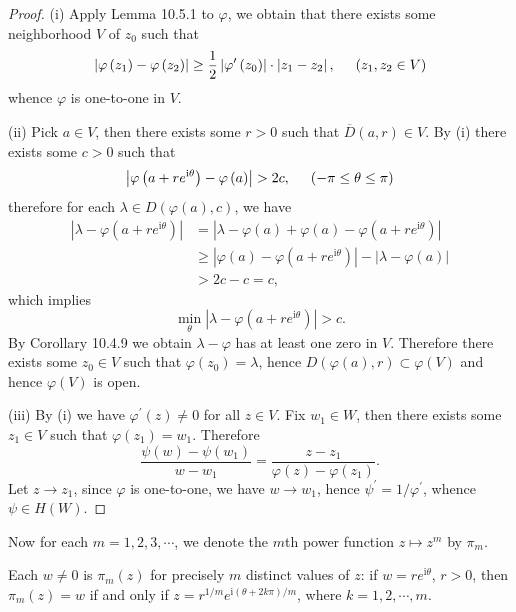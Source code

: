 \begin{proof}
(i) Apply Lemma 10.5.1 to $\varphi$, we obtain that there exists some neighborhood $V$ of $z_0$ such that 
$$
\left| \varphi \left( z_1 \right) -\varphi \left( z_2 \right) \right|\ge \frac{1}{2}\left| \varphi ^{\prime}\left( z_0 \right) \right|\cdot \left| z_1-z_2 \right|,\hspace{0.5cm}\left( z_1,z_2\in V \right) 
$$
whence $\varphi$ is one-to-one in $V$.\par
(ii) Pick $a\in V$, then there exists some $r>0$ such that $\overline{D}(a,r)\in V$. By (i) there exists some $c>0$ such that 
$$
\left| \varphi \left( a+re^{\mathrm{i}\theta} \right) -\varphi \left( a \right) \right|>2c,\hspace{0.5cm}\left( -\pi \le \theta \le \pi \right) 
$$
therefore for each $\lambda\in D(\varphi(a),c)$, we have 
$$
\begin{aligned}
\left| \lambda -\varphi \left( a+re^{\mathrm{i}\theta} \right) \right|&=\left| \lambda -\varphi \left( a \right) +\varphi \left( a \right) -\varphi \left( a+re^{\mathrm{i}\theta} \right) \right|
\\
&\ge \left| \varphi \left( a \right) -\varphi \left( a+re^{\mathrm{i}\theta} \right) \right|-\left| \lambda -\varphi \left( a \right) \right|
\\
&>2c-c=c,
\end{aligned}
$$
which implies 
$$
\min_{\theta} \left| \lambda -\varphi \left( a+re^{\mathrm{i}\theta} \right) \right|>c.
$$
By Corollary 10.4.9 we obtain $\lambda-\varphi$ has at least one zero in $V$. Therefore there exists some $z_0\in V$ such that $\varphi(z_0)=\lambda$, hence $D(\varphi(a),r)\subset\varphi(V)$ and hence $\varphi(V)$ is open.\par
(iii) By (i) we have $\varphi^\prime(z)\ne 0$ for all $z\in V$. Fix $w_1\in W$, then there exists some $z_1\in V$ such that $\varphi(z_1)=w_1$. Therefore 
$$
\frac{\psi \left( w \right) -\psi \left( w_1 \right)}{w-w_1}=\frac{z-z_1}{\varphi \left( z \right) -\varphi \left( z_1 \right)}.
$$
Let $z\to z_1$, since $\varphi$ is one-to-one, we have $w\to w_1$, hence $\psi^\prime=1/\varphi^\prime$, whence $\psi\in H(W)$.
\end{proof}
Now for each $m=1,2,3,\cdots$, we denote the $m$th power function $z\mapsto z^m$ by $\pi_m$.\par
Each $w\ne 0$ is $\pi_m(z)$ for precisely $m$ distinct values of $z$: if $w=re^{\mathrm{i}\theta}$, $r>0$, then $\pi_m(z)=w$ if and only if $z=r^{1/m}e^{\mathrm{i}\left( \theta +2k\pi \right) /m}$, where $k=1,2,\cdots,m$.\par
